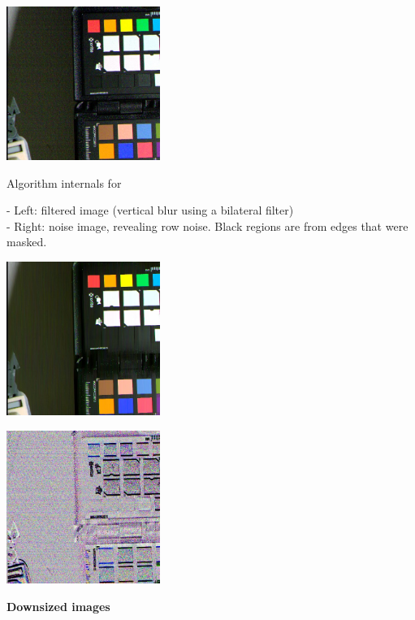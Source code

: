 {\begin{center}
\includegraphics[height=5cm]{images/10ms+4-rnfilter2-crop}
\end{center}

Algorithm internals for 

- Left: filtered image (vertical blur using a bilateral filter)\\
- Right: noise image, revealing row noise. Black regions are from edges that were masked.\\ 

\begin{center}
\includegraphics[height=5cm]{images/10ms+4-fixrn-dbg-denoised-crop}
\end{center}

\begin{center}
\includegraphics[height=5cm]{images/10ms+4-fixrn-dbg-noise-crop}
\end{center}

\textbf{Downsized images}\\

}
